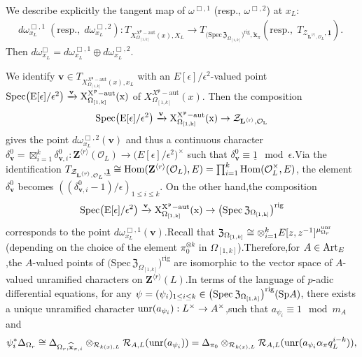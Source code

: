 \documentclass[SecEq,CM,GP]{degruyter-crelle} %
\theoremstyle{plain}
\newcommand{\Art}{{\rm Art}}
\newcommand{\homo}{{\rm Hom}}
\newcommand{\lrr}{{\langle r\rangle}}
\newcommand{\omepik}{\Omega_{[1,k]}}
\newcommand{\rigch}{{\mathcal{Z}_{\bL^{\lrr},\mathcal{O}_L}}}
\newcommand{\Spec}{\rm Spec}
\newcommand{\spr}{{\rm Sp}}
\newcommand{\sbanpik}{{\big(\mathrm{Spec}\hspace{2pt}\mathfrak{Z}_{\omepik}\big)^{\mathrm{rig}}}}
\newcommand{\unr}{{\rm unr}}
\newcommand{\xfpx}{X^{X^\fp-\mathrm{aut}}_{\omepik}(x)}
\newcommand{\bL}{{\mathbf{L}}}
\newcommand{\bZ}{{\mathbf{Z}}}
\newcommand{\bv}{{\mathbf{v}}}
\newcommand{\cR}{\mathcal R}
\newcommand{\cO}{\mathcal O}
\newcommand{\fp}{{\mathfrak{p}}}
\begin{document}
We describe explicitly the tangent map of $\omega^{\Box,1}$ (resp.,\; $\omega^{\Box,2}$) at $x_L$:
\begin{equation}\label{tangentwxl}
\begin{aligned}
	d\omega_{x_L}^{\Box,1}\;(\text{resp}.,\;d\omega_{x_L}^{\Box,2}):	T_{\xfpx,X_L} \longrightarrow T_{\sbanpik,\breve{\mathbf{{x}}}_\pi}  (\text{resp}.,\;T_{\rigch,\underline{\mathbf{1}}}) .\;
\end{aligned}
\end{equation}
Then $d\omega_{x_L}^\Box=d\omega_{x_L}^{\Box,1}\oplus d\omega_{x_L}^{\Box,2}$.\;

We identify $\bv\in T_{\xfpx,x_L}$ with an $E[\epsilon]/\epsilon^2$-valued point $\Spec \big(E[\epsilon]/\epsilon^2\big)\xrightarrow{\bv} \xfpx$ of $\xfpx$. Then the composition
\[\Spec \big(E[\epsilon]/\epsilon^2\big)\xrightarrow{\bv} \xfpx \rightarrow \rigch\]
gives the point $d\omega_{x_L}^{\Box,2}(\bv)$ and thus a continuous character $\delta_{\bv}^0=\boxtimes_{i=1}^k\delta_{\bv,i}^0:\bZ^{\lrr}(\cO_L)\longrightarrow \big(E[\epsilon]/\epsilon^2\big)^\times$ such that $\delta_{\bv}^0\equiv \underline{1}\mod \epsilon$.\;Via the identification $T_{\rigch,\underline{\mathbf{1}}}\cong \homo(\bZ^{\lrr}(\cO_L),E)=\prod_{i=1}^k\homo(\cO_L^{\times},E)$, the element 
$\delta_{\bv}^0$  becomes $((\delta_{\bv,i}^0-1)/\epsilon)_{1\leq i \leq k}$.\;
On the other hand,\;the composition 
\[\Spec \big(E[\epsilon]/\epsilon^2\big)\xrightarrow{\bv} \xfpx \rightarrow  \sbanpik\]
corresponds to the point $d\omega_{x_L}^{\Box,1}(\bv)$.\;Recall that 
$\mathfrak{Z}_{\omepik}\cong \otimes_{i=1}^kE[z,z^{-1}]^{\mu_{\Omega_{r}}^{\unr}}$ (depending on the choice of the element $\pi_0^{\otimes k}$ in $\omepik$).\;Therefore,\;for $A\in \Art_E$,\;the $A$-valued points of $\sbanpik$ are isomorphic to the vector space of $A$-valued unramified characters on $\bZ^{\lrr}(L)$.\;In terms of the language of $p$-adic differential equations,\;
for any $\psi=(\psi_i)_{1\leq i\leq k}\in \sbanpik(\spr A)$, there exists a unique unramified character $\unr(a_{\psi_i}):L^\times\rightarrow A^\times$,\;such that $a_{\psi_i}\equiv 1\mod m_A$ and
\begin{equation}\label{defdiffequation}
\psi_i^*\Delta_{\Omega_r}\cong \Delta_{\Omega_r,\widehat{\mathbf{{x}}}_{\pi,i}}\otimes_{\cR_{k(x),L}}\cR_{A,L}(\unr(a_{\psi_i}))=\Delta_{\pi_0}\otimes_{\cR_{k(x),L}}\cR_{A,L}(\unr(a_{\psi_i}\alpha_\pi q_L^{i-k})),
\end{equation}
\end{document}
